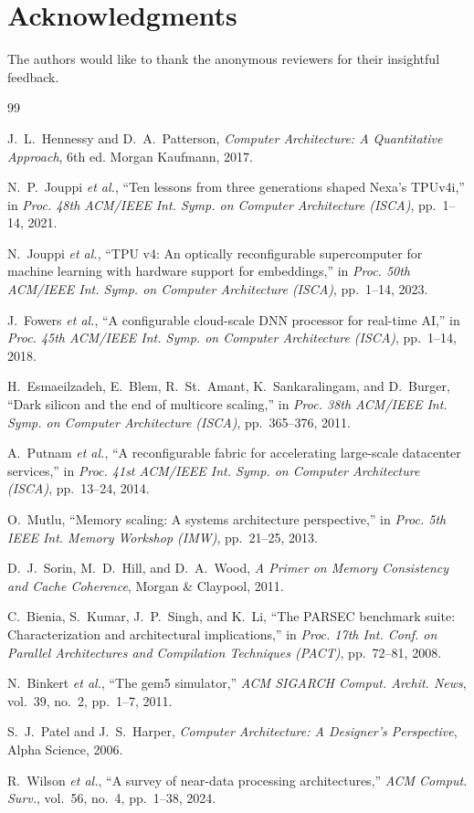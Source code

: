 \section*{Acknowledgments}
The authors would like to thank the anonymous reviewers for their
insightful feedback.

\begin{thebibliography}{99}

J.~L.~Hennessy and D.~A.~Patterson,
\textit{Computer Architecture: A Quantitative Approach},
6th ed. Morgan Kaufmann, 2017.

N.~P.~Jouppi \textit{et al.},
``Ten lessons from three generations shaped Nexa's TPUv4i,''
in \textit{Proc. 48th ACM/IEEE Int. Symp. on Computer Architecture (ISCA)},
pp.~1--14, 2021.

N.~Jouppi \textit{et al.},
``TPU v4: An optically reconfigurable supercomputer for machine learning
with hardware support for embeddings,''
in \textit{Proc. 50th ACM/IEEE Int. Symp. on Computer Architecture (ISCA)},
pp.~1--14, 2023.

J.~Fowers \textit{et al.},
``A configurable cloud-scale DNN processor for real-time AI,''
in \textit{Proc. 45th ACM/IEEE Int. Symp. on Computer Architecture (ISCA)},
pp.~1--14, 2018.

H.~Esmaeilzadeh, E.~Blem, R.~St.~Amant, K.~Sankara\-lingam, and D.~Burger,
``Dark silicon and the end of multicore scaling,''
in \textit{Proc. 38th ACM/IEEE Int. Symp. on Computer Architecture (ISCA)},
pp.~365--376, 2011.

A.~Putnam \textit{et al.},
``A reconfigurable fabric for accelerating large-scale datacenter services,''
in \textit{Proc. 41st ACM/IEEE Int. Symp. on Computer Architecture (ISCA)},
pp.~13--24, 2014.

O.~Mutlu,
``Memory scaling: A systems architecture perspective,''
in \textit{Proc. 5th IEEE Int. Memory Workshop (IMW)}, pp.~21--25, 2013.

D.~J.~Sorin, M.~D.~Hill, and D.~A.~Wood,
\textit{A Primer on Memory Consistency and Cache Coherence},
Morgan \& Claypool, 2011.

C.~Bienia, S.~Kumar, J.~P.~Singh, and K.~Li,
``The PARSEC benchmark suite: Characterization and architectural
implications,''
in \textit{Proc. 17th Int. Conf. on Parallel Architectures and
Compilation Techniques (PACT)}, pp.~72--81, 2008.

N.~Binkert \textit{et al.},
``The gem5 simulator,''
\textit{ACM SIGARCH Comput. Archit. News}, vol.~39, no.~2, pp.~1--7, 2011.

S.~J.~Patel and J.~S.~Harper,
\textit{Computer Architecture: A Designer's Perspective},
Alpha Science, 2006.

R.~Wilson \textit{et al.},
``A survey of near-data processing architectures,''
\textit{ACM Comput. Surv.}, vol.~56, no.~4, pp.~1--38, 2024.

\end{thebibliography}

